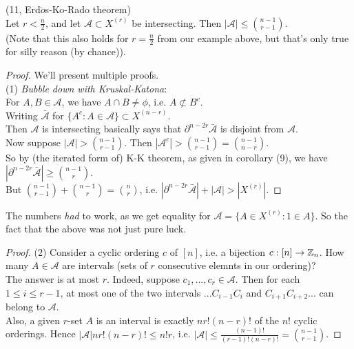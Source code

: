 \documentclass[a4paper]{article}
\begin{document}
\begin{thm} (11, Erd$\ddot{o}$s-Ko-Rado theorem)\\
    Let $r < \frac{n}{2}$, and let $\mathcal{A} \subset X^{(r)}$ be intersecting. Then $|\mathcal{A}| \leq {{n-1} \choose {r-1}}$.\\
    (Note that this also holds for $r = \frac{n}{2}$ from our example above, but that's only true for silly reason (by chance)).
    \begin{proof}
        We'll present multiple proofs.\\
        (1) \emph{Bubble down with Kruskal-Katona}:\\
        For $A,B \in \mathcal{A}$, we have $A \cap B \neq \phi$, i.e. $A \not\subset B^c$.\\
        Writing $\bar{\mathcal{A}}$ for $\{A^c:A \in \mathcal{A}\} \subset X^{(n-r)}$.\\
        Then $\mathcal{A}$ is intersecting basically says that $\partial^{n-2r} \bar{\mathcal{A}}$ is disjoint from $\mathcal{A}$.\\
        Now suppose $|\mathcal{A}| > {{n-1} \choose {r-1}}$. Then $|\mathcal{A}^c| > {{n-1} \choose {r-1}} = {{n-1} \choose {n-r}}$.\\
        So by (the iterated form of) K-K theorem, as given in corollary (9), we have $|\partial^{n-2r} \bar{\mathcal{A}}| \geq {{n-1} \choose r}$.\\
        But ${{n-1} \choose {r-1}} + {{n-1} \choose r} = {n \choose r}$, i.e. $|\partial^{n-2r} \bar{\mathcal{A}}| + |\mathcal{A}| > |X^{(r)}|$.
    \end{proof}

    \begin{rem}
        The numbers \emph{had} to work, as we get equality for $\mathcal{A} = \{A \in X^{(r)} : 1 \in A\}$. So the fact that the above was not just pure luck.
    \end{rem}

    \begin{proof}
        (2) Consider a cyclic ordering $c$ of $[n]$, i.e. a bijection $c:[n] \to \mathbb{Z}_n$. How many $A \in \mathcal{A}$ are intervals (sets of $r$ consecutive elemnts in our ordering)?\\
        The answer is at most $r$. Indeed, suppose $c_1,...,c_r \in \mathcal{A}$. Then for each $1 \leq i \leq r-1$, at most one of the two intervals $...C_{i-1}C_i$ and $C_{i+1}C_{i+2}...$ can belong to $\mathcal{A}$.\\
        Also, a given $r$-set $A$ is an interval is exactly $n r! (n-r)!$ of the $n!$ cyclic orderings. Hence $|\mathcal{A}| n r! (n-r)! \leq n! r$, i.e. $|\mathcal{A}| \leq \frac{(n-1)!}{(r-1)!(n-r)!} = {{n-1} \choose {r-1}}$.
    \end{proof}


\end{thm}
\end{document}
